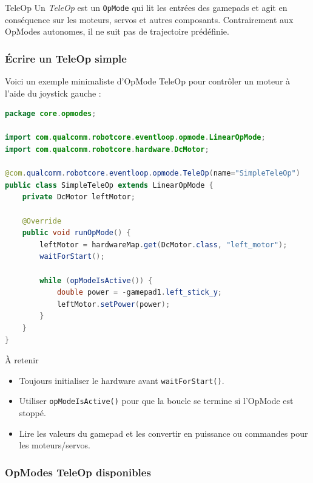 \documentclass[12pt, a4paper]{report}
\begin{document}
    \begin{mydefinition}{TeleOp}
        Un \textit{TeleOp} est un \texttt{OpMode} qui lit les entrées des gamepads et agit en conséquence sur les moteurs, servos et autres composants. Contrairement aux OpModes autonomes, il ne suit pas de trajectoire prédéfinie.
    \end{mydefinition}


    \subsubsection*{Écrire un TeleOp simple}

    Voici un exemple minimaliste d’OpMode TeleOp pour contrôler un moteur à l’aide du joystick gauche :

    \begin{lstlisting}[language=Java]
package core.opmodes;

import com.qualcomm.robotcore.eventloop.opmode.LinearOpMode;
import com.qualcomm.robotcore.hardware.DcMotor;

@com.qualcomm.robotcore.eventloop.opmode.TeleOp(name="SimpleTeleOp")
public class SimpleTeleOp extends LinearOpMode {
    private DcMotor leftMotor;

    @Override
    public void runOpMode() {
        leftMotor = hardwareMap.get(DcMotor.class, "left_motor");
        waitForStart();

        while (opModeIsActive()) {
            double power = -gamepad1.left_stick_y;
            leftMotor.setPower(power);
        }
    }
}
    \end{lstlisting}

    \begin{myinfo}{À retenir}
        \begin{itemize}
            \item Toujours initialiser le hardware avant \texttt{waitForStart()}.
            \item Utiliser \texttt{opModeIsActive()} pour que la boucle se termine si l'OpMode est stoppé.
            \item Lire les valeurs du gamepad et les convertir en puissance ou commandes pour les moteurs/servos.
        \end{itemize}
    \end{myinfo}

    \subsubsection*{OpModes TeleOp disponibles}
\end{document}
